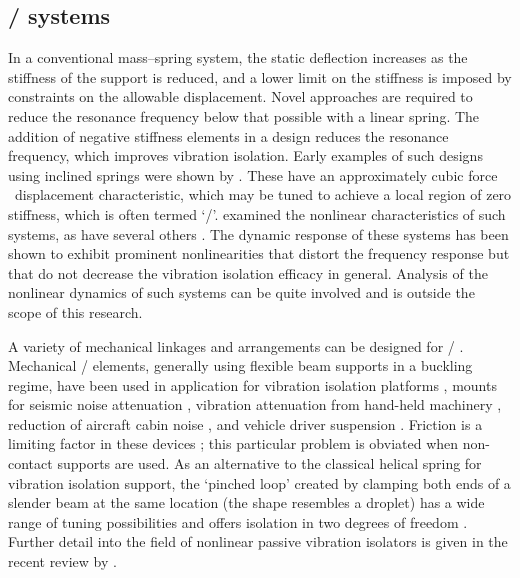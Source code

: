 \documentclass[11pt,a4paper]{memoir}
\begin{document}
\subsection{\QZS/ systems}

In a conventional mass--spring system, the static deflection increases as the stiffness of the support is reduced, and a lower limit on the stiffness is imposed by constraints on the allowable displacement.
Novel approaches are required to reduce the resonance frequency below that possible with a linear spring.
The addition of negative stiffness elements in a design reduces the resonance frequency, which improves vibration isolation.
Early examples of such designs using inclined springs were shown by \textcite{molyneux1957}.
These have an approximately cubic force \vs\ displacement characteristic, which may be tuned to achieve a local region of zero stiffness, which is often termed `\qzs/'.
\textcite{alabuzhev1989} examined the nonlinear characteristics of such systems, as have several others
\cite{carrella2007-jsv,kovacic2008,carrella2009-jsv}.
The dynamic response of these systems has been shown to exhibit prominent nonlinearities that distort the frequency response but that do not decrease the vibration isolation efficacy in general.
Analysis of the nonlinear dynamics of such systems \cite{lee2004-jsv,kovacic2008,kovacic2009} can be quite involved and is outside the scope of this research.

A variety of mechanical linkages and arrangements can be designed for \qzs/ \cite{tarnai2003}.
Mechanical \qzs/ elements, generally using flexible beam supports in a buckling regime, have been used in application for vibration isolation platforms \cite{platus1999}, mounts for seismic noise attenuation \cite{cella2005}, vibration attenuation from hand-held machinery \cite{sokolov2007}, reduction of aircraft cabin noise \cite{baklanov2007-jsv}, and vehicle driver suspension \cite{lee2007-jsv}.
Friction is a limiting factor in these devices \cite{sokolov2007,araki2013-jsv}; this particular problem is obviated when non-contact supports are used.
As an alternative to the classical helical spring for vibration isolation support, the `pinched loop' created by clamping both ends of a slender beam at the same location (the shape resembles a droplet) has a wide range of tuning possibilities and offers isolation in two degrees of freedom \parencite{virgin2008}.
Further detail into the field  of nonlinear passive vibration isolators is given in the recent review by \textcite{ibrahim2008}.
\end{document}
